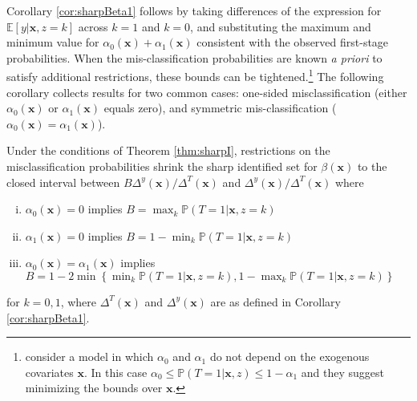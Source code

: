 Corollary \ref{cor:sharpBeta1} follows by taking differences of the expression for $\mathbb{E}[y|\mathbf{x},z=k]$ across $k=1$ and $k=0$, and substituting the maximum and minimum value for $\alpha_0(\mathbf{x}) + \alpha_1(\mathbf{x})$ consistent with the observed first-stage probabilities.
When the mis-classification probabilities are known \emph{a priori} to satisfy additional restrictions, these bounds can be tightened.\footnote{\cite{FL} consider a model in which $\alpha_0$ and $\alpha_1$ do not depend on the exogenous covariates $\mathbf{x}$. In this case $\alpha_0 \leq \mathbb{P}(T=1|\mathbf{x},z)\leq 1 - \alpha_1$ and they suggest minimizing the bounds over $\mathbf{x}$.}
The following corollary collects results for two common cases: one-sided misclassification (either $\alpha_0(\mathbf{x})$ or $\alpha_1(\mathbf{x})$ equals zero), and symmetric mis-classification ($\alpha_0(\mathbf{x}) = \alpha_1(\mathbf{x})$).

\begin{cor}
  \label{cor:onsided}
  Under the conditions of Theorem \ref{thm:sharpI}, restrictions on the misclassification probabilities shrink the sharp identified set for $\beta(\mathbf{x})$ to the closed interval between $B\Delta^y(\mathbf{x})/\Delta^T(\mathbf{x})$ and $\Delta^y(\mathbf{x})/\Delta^T(\mathbf{x})$ where
  \begin{enumerate}[(i)]
    \item $\alpha_0(\mathbf{x})=0$ implies $B = \max_k \mathbb{P}(T=1|\mathbf{x},z=k)$ 
    \item $\alpha_1(\mathbf{x})=0$ implies $B = 1 - \min_k \mathbb{P}(T=1|\mathbf{x},z=k)$ 
    \item $\alpha_0(\mathbf{x})=\alpha_1(\mathbf{x})$ implies $B =  1 - 2 \min\left\{ \min_k \mathbb{P}(T=1|\mathbf{x},z=k), 1 - \max_k \mathbb{P}(T=1|\mathbf{x},z=k) \right\}$ 
  \end{enumerate}
  for $k = 0,1$, where $\Delta^T(\mathbf{x})$ and $\Delta^y(\mathbf{x})$ are as defined in Corollary \ref{cor:sharpBeta1}.
\end{cor}

